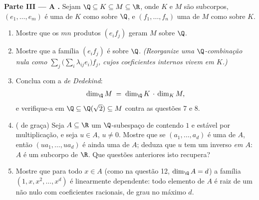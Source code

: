 \begin{problem}
\medskip
\noindent\textbf{Parte III --- A .} Sejam $\Q \subseteq K
\subseteq M \subseteq \R$, onde
$K$ e $M$ são subcorpos, $(e_1,
\dots, e_m)$ é uma  de $K$ como  sobre $\Q$, e $(f_1,
\dots, f_n)$ uma  de $M$ como 
sobre $K$.
\begin{enumerate}[resume]
  \item Mostre que os $mn$ produtos $(e_i f_j)$ geram $M$ sobre $\Q$.
  \item Mostre que a família $(e_i f_j)$ é  sobre $\Q$.
        \emph{(Reorganize uma $\Q$-combinação nula como $\sum_j
        \bigl(\sum_i \lambda_{ij} e_i\bigr) f_j$,
        cujos coeficientes internos vivem em $K$.)}
  \item Conclua com a \emph{ de Dedekind}:
        \[
        \dim_\Q M \;=\; \dim_\Q K \,\cdot\, \dim_K M ,
        \]
        e verifique-a em $\Q \subseteq \Q(\sqrt2) \subseteq M$ contra as questões 7 e 8.
  \item ( de graça) Seja $A \subseteq \R$ um $\Q$-subespaço de  contendo $1$ e estável por multiplicação, e seja
        $u \in A$, $u \neq
        0$. Mostre que se $(a_1, \dots, a_d)$ é uma  de $A$,
        então $(u a_1, \dots, u a_d)$ é ainda uma  de $A$; deduza que $u$ tem um
        inverso \emph{em $A$}: $A$ é um subcorpo de $\R$. Que
        questões anteriores isto recupera?
  \item Mostre que para todo $x \in A$ (como na questão 12, $\dim_\Q
        A = d$)
        a família $(1, x, x^2, \dots, x^{d})$ é linearmente dependente: todo elemento de
        $A$ é raiz de um  não nulo com coeficientes
        racionais, de grau no máximo $d$.
\end{enumerate}


\end{problem}
